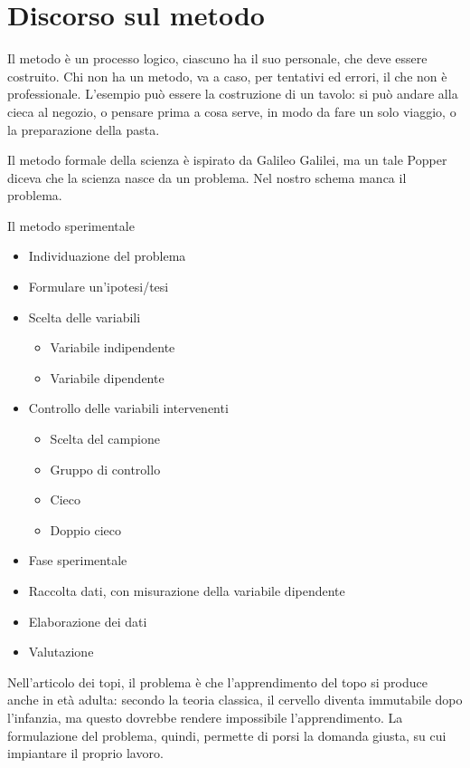 \mainmatter
\chapter{Discorso sul metodo}
Il metodo è un processo logico, ciascuno ha il suo personale, che deve essere costruito. Chi non ha un metodo, va a caso, per tentativi
ed errori, il che non è professionale. L'esempio può essere la costruzione di un tavolo: si può andare alla cieca al negozio, o pensare
prima a cosa serve, in modo da fare un solo viaggio, o la preparazione della pasta.

Il metodo formale della scienza è ispirato da Galileo Galilei, ma un tale Popper diceva che la scienza nasce da un problema. Nel nostro
schema manca il problema. 
\begin{large}
Il metodo sperimentale
\end{large}
\begin{itemize}
\item Individuazione del problema
\item Formulare un'ipotesi/tesi
\item Scelta delle variabili
\begin{itemize}
\item Variabile indipendente
\item Variabile dipendente
\end{itemize}
\item Controllo delle variabili intervenenti
\begin{itemize}
\item Scelta del campione
\item Gruppo di controllo
\item Cieco
\item Doppio cieco
\end{itemize}
\item Fase sperimentale
\item Raccolta dati, con misurazione della variabile dipendente
\item Elaborazione dei dati
\item Valutazione
\end{itemize}
Nell'articolo dei topi, il problema è che l'apprendimento del topo si produce anche in età adulta: secondo la teoria classica, il
cervello diventa immutabile dopo l'infanzia, ma questo dovrebbe rendere impossibile l'apprendimento. La formulazione del problema,
quindi, permette di porsi la domanda giusta, su cui impiantare il proprio lavoro.

